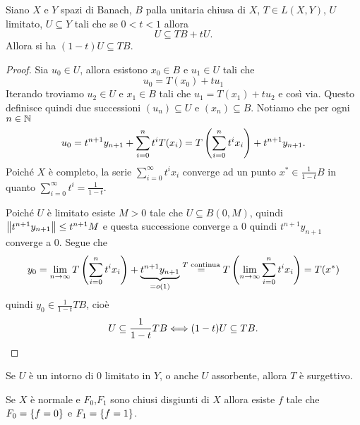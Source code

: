 \begin{lemma}[di iterazione]\label{LmDiIterazione}
Siano $X$ e $Y$ spazi di Banach, $B$ palla unitaria chiusa di $X$, $T\in L(X,Y)$, $U$ limitato, $U\subseteq Y$ tali che se $0<t<1$ allora
\[U\subseteq TB+tU.\]
Allora si ha $(1-t)U\subseteq TB$.
\end{lemma}
\begin{proof}
Sia $u_0\in U$, allora esistono $x_0\in B$ e $u_1\in U$ tali che 
\[u_0=T(x_0)+tu_1\]
Iterando troviamo $u_2\in U$ e $x_1\in B$ tali che $u_1=T(x_1)+tu_2$ e cos\`i via. Questo definisce quindi due successioni $(u_n)\subseteq U$ e $(x_n)\subseteq B$. Notiamo che per ogni $n\in\N$
\[u_0=t^{n+1}y_{n+1}+\sum_{i=0}^nt^iT(x_i)=T\pa{\sum_{i=0}^nt^ix_i}+t^{n+1}y_{n+1}.\]
Poich\'e $X$ \`e completo, la serie $\sum_{i=0}^\infty t^i x_i$ converge ad un punto $x^\ast\in \frac1{1-t}B$ in quanto $\sum_{i=0}^\infty t^i=\frac1{1-t}$.

Poich\'e $U$ \`e limitato esiste $M>0$ tale che $U\subseteq B(0,M)$, quindi $\norm{t^{n+1} y_{n+1}}\leq t^{n+1}M$ e questa successione converge a $0$ quindi $t^{n+1} y_{n+1}$ converge a $0$. Segue che
\[y_0=\lim_{n\to\infty} T\pa{\sum_{i=0}^nt^i x_i}+\under{=o(1)}{t^{n+1}y_{n+1}}\pasgnl={$T$ continua}T\pa{\lim_{n\to\infty}\sum_{i=0}^nt^ix_i}=T(x^\ast)\]
quindi $y_0\in \frac1{1-t}T B$, cio\`e
\[U\subseteq \frac1{1-t}TB\coimplies (1-t)U\subseteq TB.\]
\end{proof}

\begin{remark}
Se $U$ \`e un intorno di $0$ limitato in $Y$, o anche $U$ assorbente, allora $T$ \`e surgettivo.
\end{remark}

\begin{theorem}\label{ThLemmaUrysohn}
Se $X$ \`e normale e $F_0$,$F_1$ sono chiusi disgiunti di $X$ allora esiste $f$ tale che $F_0=\cpa{f=0}$ e $F_1=\cpa{f=1}$.
\end{theorem}

